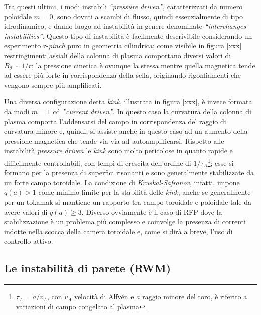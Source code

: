 Tra questi ultimi, i modi instabili \emph{``pressure driven''},
caratterizzati da numero poloidale $m=0$, sono dovuti a scambi di
flusso, quindi essenzialmente di tipo idrodinamico, e danno luogo ad
instabilità in genere denominate \emph{``interchanges
instabilities''}. Questo tipo di instabilità è facilmente descrivibile
considerando un esperimento z-\emph{pinch} puro in geometria cilindrica;
come visibile in figura [xxx] restringimenti assiali della colonna di
plasma comportano diversi valori di $B_\theta \sim 1/r$; la pressione
cinetica è ovunque la stessa mentre quella magnetica tende ad essere più
forte in corrispondenza della sella, originando rigonfiamenti che
vengono sempre più amplificati.

Una diversa configurazione detta \emph{kink}, illustrata in figura
[xxx], è invece formata da modi $m=1$ cd \emph{''current driven''}. In
questo caso la curvatura della colonna di plasma comporta l'addensarsi
del campo in corrispondenza del raggio di curvatura minore e, quindi, si
assiste anche in questo caso ad un aumento della pressione magnetica che
tende via via ad autoamplificarsi. Rispetto alle instabilità
\emph{pressure driven} le \emph{kink} sono molto pericolose in quanto
rapide e difficilmente controllabili, con tempi di crescita dell'ordine
di $1/\tau_A$\footnote{$\tau_A = a/v_A$, con $v_A$ velocità di Alfvén e
$a$ raggio minore del toro, è riferito a variazioni di campo congelato
al plasma\cite{fridberg} }; esse si formano per la presenza di superfici
risonanti e sono generalmente stabilizzate da un forte campo
toroidale. La condizione di \emph{Kruskal-Safranov}, infatti, impone
$q(a)>1$ come minimo limite per la stabilità delle \emph{kink}, anche se
generalmente per un tokamak si mantiene un rapporto tra campo toroidale
e poloidale tale da avere valori di $q(a)\geq3$. Diverso ovviamente è il
caso di RFP dove la stabilizzazione è un problema più complesso e
coinvolge la presenza di correnti indotte nella scocca della camera
toroidale e, come si dirà a breve, l'uso di controllo attivo.

\subsection{Le instabilità di parete (RWM)}

